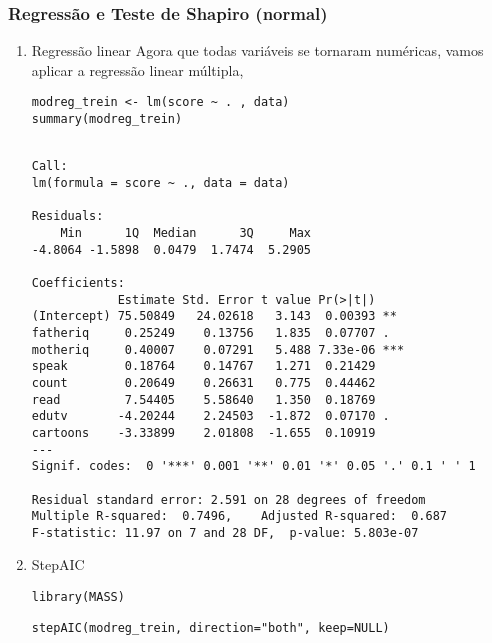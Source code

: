 \documentclass[11pt]{article}
\begin{document}
\subsubsection{Regressão e Teste de Shapiro (normal)}
\label{sec:orgdeba718}
\begin{enumerate}
\item Regressão linear
\label{sec:org2ac48e7}
Agora que todas variáveis se tornaram numéricas, vamos aplicar a regressão linear múltipla,

\begin{verbatim}
modreg_trein <- lm(score ~ . , data)
summary(modreg_trein)
\end{verbatim}

\begin{verbatim}

Call:
lm(formula = score ~ ., data = data)

Residuals:
    Min      1Q  Median      3Q     Max 
-4.8064 -1.5898  0.0479  1.7474  5.2905 

Coefficients:
            Estimate Std. Error t value Pr(>|t|)    
(Intercept) 75.50849   24.02618   3.143  0.00393 ** 
fatheriq     0.25249    0.13756   1.835  0.07707 .  
motheriq     0.40007    0.07291   5.488 7.33e-06 ***
speak        0.18764    0.14767   1.271  0.21429    
count        0.20649    0.26631   0.775  0.44462    
read         7.54405    5.58640   1.350  0.18769    
edutv       -4.20244    2.24503  -1.872  0.07170 .  
cartoons    -3.33899    2.01808  -1.655  0.10919    
---
Signif. codes:  0 '***' 0.001 '**' 0.01 '*' 0.05 '.' 0.1 ' ' 1

Residual standard error: 2.591 on 28 degrees of freedom
Multiple R-squared:  0.7496,	Adjusted R-squared:  0.687 
F-statistic: 11.97 on 7 and 28 DF,  p-value: 5.803e-07

\end{verbatim}

\item StepAIC
\label{sec:orgc82f4ca}
\begin{verbatim}
library(MASS)
\end{verbatim}

\begin{verbatim}
stepAIC(modreg_trein, direction="both", keep=NULL)
\end{verbatim}


\end{enumerate}
\end{document}

